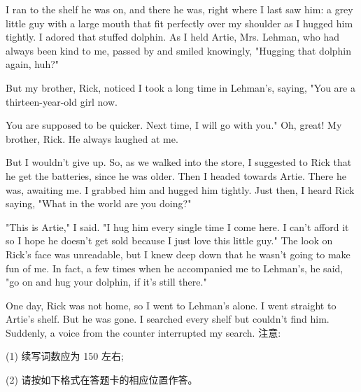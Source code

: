 \documentclass{英语试卷}
\begin{document}
\par I ran to the shelf he was on, and there he was, right where I last saw him: a grey little guy with a large mouth that fit perfectly over my shoulder as I hugged him tightly. I adored that stuffed dolphin. As I held Artie, Mrs. Lehman, who had always been kind to me, passed by and smiled knowingly, "Hugging that dolphin again, huh?"\par
\par But my brother, Rick, noticed I took a long time in Lehman's, saying, "You are a thirteen-year-old girl now.\par
\par You are supposed to be quicker. Next time, I will go with you." Oh, great! My brother, Rick. He always laughed at me.\par
\par But I wouldn't give up. So, as we walked into the store, I suggested to Rick that he get the batteries, since he was older. Then I headed towards Artie. There he was, awaiting me. I grabbed him and hugged him tightly. Just then, I heard Rick saying, "What in the world are you doing?"\par
\par "This is Artie," I said. "I hug him every single time I come here. I can't afford it so I hope he doesn't get sold because I just love this little guy." The look on Rick's face was unreadable, but I knew deep down that he wasn't going to make fun of me. In fact, a few times when he accompanied me to Lehman's, he said, "go on and hug your dolphin, if it's still there."\par
\par One day, Rick was not home, so I went to Lehman's alone. I went straight to Artie's shelf. But he was gone. I searched every shelf but couldn't find him. Suddenly, a voice from the counter interrupted my search. 注意:\par
\par (1) 续写词数应为 150 左右;\par
\par (2) 请按如下格式在答题卡的相应位置作答。\par
{}
\end{document}
